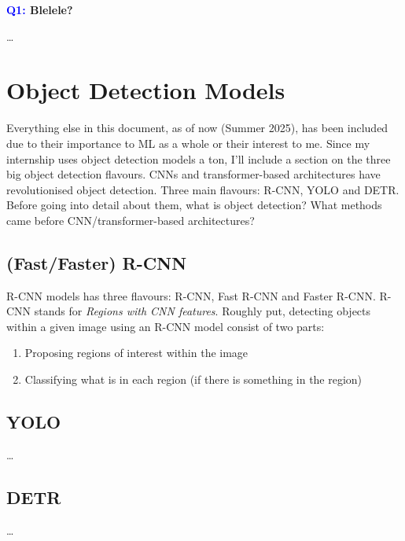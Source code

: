 \documentclass[11pt]{article}
\begin{document}
\begin{center}
    \textbf{\textcolor{blue}{Q1:} Blelele?}
\end{center}
\dots

\section{Object Detection Models}

Everything else in this document, as of now (Summer 2025), has been included due to their importance to ML as a whole or their interest to me. Since my internship uses object detection models a ton, I'll include a section on the three big object detection flavours. CNNs and transformer-based architectures have revolutionised object detection. Three main flavours: R-CNN, YOLO and DETR. Before going into detail about them, what is object detection? What methods came before CNN/transformer-based architectures?

\subsection{(Fast/Faster) R-CNN}
R-CNN models has three flavours: R-CNN, Fast R-CNN and Faster R-CNN. R-CNN stands for \textit{Regions with CNN features}. Roughly put, detecting objects within a given image using an R-CNN model consist of two parts:
\begin{enumerate}
    \item Proposing regions of interest within the image
    \item Classifying what is in each region (if there is something in the region)
\end{enumerate}

\subsection{YOLO}
\dots

\subsection{DETR}
\dots
\end{document}
